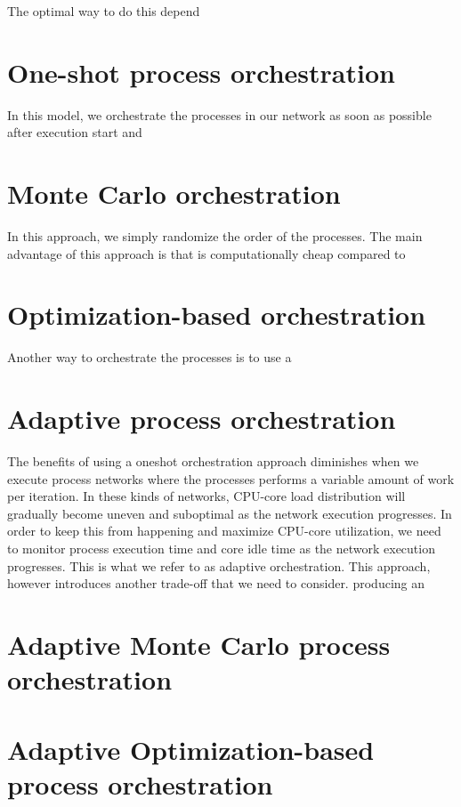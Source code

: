 The optimal way to do this depend

\section{One-shot process orchestration}
In this model, we orchestrate the processes in our network as soon as
possible after execution start and

\section{Monte Carlo orchestration}
In this approach, we simply randomize the order of the processes. The
main advantage of this approach is that is computationally cheap
compared to 

\section{Optimization-based orchestration}
Another way to orchestrate the processes is to use a 


\section{Adaptive process orchestration}
The benefits of using a oneshot orchestration approach diminishes when
we execute process networks where the processes performs a variable
amount of work per iteration. In these kinds of networks, CPU-core
load distribution will gradually become uneven and suboptimal as the
network execution progresses. In order to keep this from happening and
maximize CPU-core utilization, we need to monitor process execution
time and core idle time as the network execution progresses. This is
what we refer to as adaptive orchestration. This approach, however
introduces another trade-off that we need to consider. producing an 

\section{Adaptive Monte Carlo process orchestration}

\section{Adaptive Optimization-based process orchestration}



